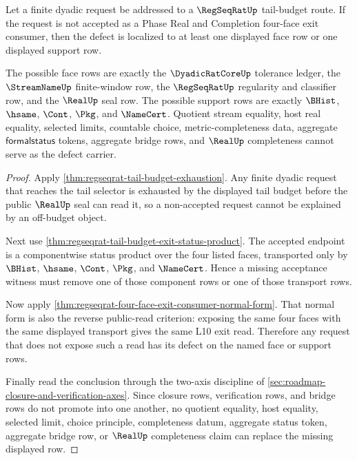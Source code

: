 \begin{theorem}
\label{thm:regseqrat-tail-budget-finite-window-refusal-localization}
Let a finite dyadic request be addressed to a $\RegSeqRatUp$ tail-budget route. If the request is not accepted as a Phase Real and Completion four-face exit consumer, then the defect is localized to at least one displayed face row or one displayed support row.

The possible face rows are exactly the $\DyadicRatCoreUp$ tolerance ledger, the $\StreamNameUp$ finite-window row, the $\RegSeqRatUp$ regularity and classifier row, and the $\RealUp$ seal row. The possible support rows are exactly $\BHist$, $\hsame$, $\Cont$, $\Pkg$, and $\NameCert$. Quotient stream equality, host real equality, selected limits, countable choice, metric-completeness data, aggregate $\mathsf{formalstatus}$ tokens, aggregate bridge rows, and $\RealUp$ completeness cannot serve as the defect carrier.
\end{theorem}
\begin{proof}
Apply \autoref{thm:regseqrat-tail-budget-exhaustion}. Any finite dyadic request that reaches the tail selector is exhausted by the displayed tail budget before the public $\RealUp$ seal can read it, so a non-accepted request cannot be explained by an off-budget object.

Next use \autoref{thm:regseqrat-tail-budget-exit-status-product}. The accepted endpoint is a componentwise status product over the four listed faces, transported only by $\BHist$, $\hsame$, $\Cont$, $\Pkg$, and $\NameCert$. Hence a missing acceptance witness must remove one of those component rows or one of those transport rows.

Now apply \autoref{thm:regseqrat-four-face-exit-consumer-normal-form}. That normal form is also the reverse public-read criterion: exposing the same four faces with the same displayed transport gives the same L10 exit read. Therefore any request that does not expose such a read has its defect on the named face or support rows.

Finally read the conclusion through the two-axis discipline of \autoref{sec:roadmap-closure-and-verification-axes}. Since closure rows, verification rows, and bridge rows do not promote into one another, no quotient equality, host equality, selected limit, choice principle, completeness datum, aggregate status token, aggregate bridge row, or $\RealUp$ completeness claim can replace the missing displayed row.
\end{proof}

